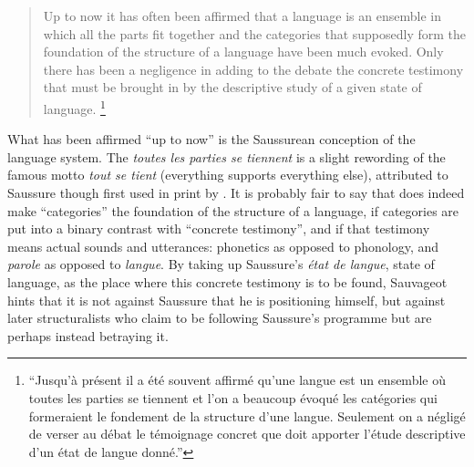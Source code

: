 \documentclass[output=paper]{langscibook}
\begin{document}
\begin{quotation}
Up to now it has often been affirmed that a language is an ensemble in which all the parts fit together and the categories that supposedly form the foundation of the structure of a language have been much evoked. Only there has been a negligence in adding to the debate the concrete testimony that must be brought in by the descriptive study of a given state of language. \citep[7]{Sauvageot1946}\footnote{``Jusqu'à présent il a été souvent affirmé qu'une langue est un ensemble où toutes les parties se tiennent et l'on a beaucoup évoqué les catégories qui formeraient le fondement de la structure d'une langue. Seulement on a négligé de verser au débat le témoignage concret que doit apporter l'étude descriptive d'un état de langue donné.''}
\end{quotation}

What has been affirmed ``up to now'' is the Saussurean conception of the language system. The \emph{toutes les parties se tiennent} is a slight rewording of the famous motto \emph{tout se tient} (everything supports everything else), attributed to Saussure though first used in print by \citet[407]{Meillet1903}. It is probably fair to say that  does indeed make ``categories'' the foundation of the structure of a language, if categories are put into a binary contrast with ``concrete testimony'', and if that testimony means actual sounds and utterances: phonetics as opposed to phonology, and \emph{parole} as opposed to \emph{langue}. By taking up Saussure's \emph{état de langue}, state of language, as the place where this concrete testimony is to be found, Sauvageot hints that it is not against Saussure that he is positioning himself, but against later structuralists who claim to be following Saussure's programme but are perhaps instead betraying it.
\end{document}
